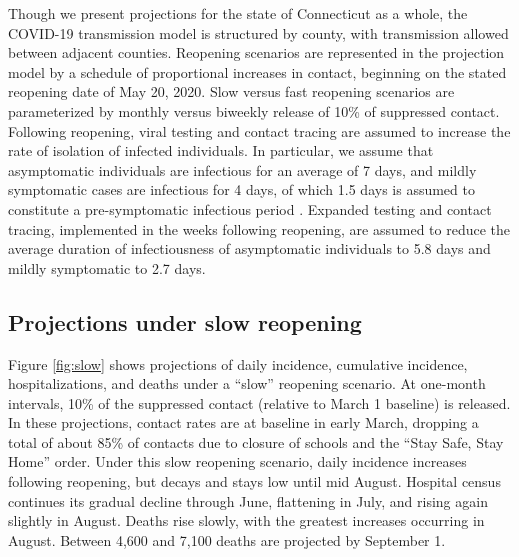 \documentclass[11pt]{article}
\begin{document}
Though we present projections for the state of Connecticut as a whole, the COVID-19 transmission model is structured by county, with transmission allowed between adjacent counties. Reopening scenarios are represented in the projection model by a schedule of proportional increases in contact, beginning on the stated reopening date of May 20, 2020. Slow versus fast reopening scenarios are parameterized by monthly versus biweekly release of 10\% of suppressed contact.  Following reopening, viral testing and contact tracing are assumed to increase the rate of isolation of infected individuals. In particular, we assume that asymptomatic individuals are infectious for an average of 7 days, and mildly symptomatic cases are infectious for 4 days, of which 1.5 days is assumed to constitute a pre-symptomatic infectious period \citep{li2020substantial, kissler2020projecting, salje2020estimating, wolfel2020virological, wei2020presymptomatic}. Expanded testing and contact tracing, implemented in the weeks following reopening, are assumed to reduce the average duration of infectiousness of asymptomatic individuals to 5.8 days and mildly symptomatic to 2.7 days. 


\subsection*{Projections under slow reopening} 

Figure \ref{fig:slow} shows projections of daily incidence, cumulative incidence, hospitalizations, and deaths under a ``slow'' reopening scenario. At one-month intervals, 10\% of the suppressed contact (relative to March 1 baseline) is released.  In these projections, contact rates are at baseline in early March, dropping a total of about 85\% of contacts due to closure of schools and the ``Stay Safe, Stay Home'' order.  Under this slow reopening scenario, daily incidence increases following reopening, but decays and stays low until mid August.  Hospital census continues its gradual decline through June, flattening in July, and rising again slightly in August. Deaths rise slowly, with the greatest increases occurring in August. Between 4,600 and 7,100 deaths are projected by September 1.  
\end{document}
